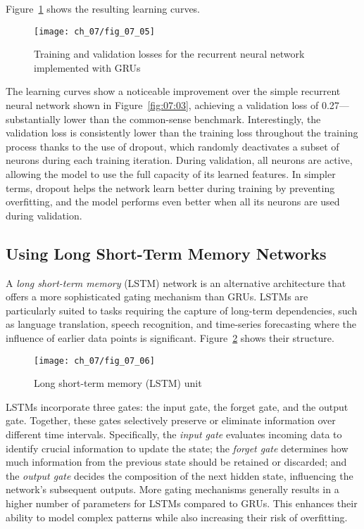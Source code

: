 Figure~\ref{fig:07:05} shows the resulting learning curves.

\begin{figure}[H]
	\texttt{[image: ch\_07/fig\_07\_05]} 
	\caption{Training and validation losses for the recurrent neural network implemented with GRUs}
	\label{fig:07:05}
\end{figure}

The learning curves show a noticeable improvement over the simple recurrent neural network shown in Figure~\ref{fig:07:03}, achieving a validation loss of 0.27---substantially lower than the common-sense benchmark.
Interestingly, the validation loss is consistently lower than the training loss throughout the training process thanks to the use of dropout, which randomly deactivates a subset of neurons during each training iteration. During validation, all neurons are active, allowing the model to use the full capacity of its learned features.
In simpler terms, dropout helps the network learn better during training by preventing overfitting, and the model performs even better when all its neurons are used during validation.

\subsection{Using Long Short-Term Memory Networks}

A \emph{long short-term memory} (LSTM) network is an alternative architecture that offers a more sophisticated gating mechanism than GRUs. LSTMs are particularly suited to tasks requiring the capture of long-term dependencies, such as language translation, speech recognition, and time-series forecasting where the influence of earlier data points is significant. Figure~\ref{fig:07:06} shows their structure.

\begin{figure}[H]
	\texttt{[image: ch\_07/fig\_07\_06]} 
	\caption{Long short-term memory (LSTM) unit}
	\label{fig:07:06}
\end{figure}

LSTMs incorporate three gates: the input gate, the forget gate, and the output gate. Together, these gates selectively preserve or eliminate information over different time intervals.
Specifically, the \emph{input gate} evaluates incoming data to identify crucial information to update the state;
the \emph{forget gate} determines how much information from the previous state should be retained or discarded;
and the \emph{output gate} decides the composition of the next hidden state, influencing the network's subsequent outputs.
More gating mechanisms generally results in a higher number of parameters for LSTMs compared to GRUs. This enhances their ability to model complex patterns while also increasing their risk of overfitting.

